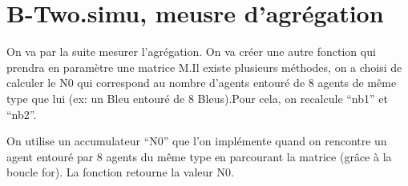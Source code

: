 \documentclass[
]{article}
\begin{document}
\hypertarget{b-two.simu-meusre-dagruxe9gation}{%
\section{B-Two.simu, meusre
d'agrégation}\label{b-two.simu-meusre-dagruxe9gation}}

On va par la suite mesurer l'agrégation. On va créer une autre fonction
qui prendra en paramètre une matrice M.Il existe plusieurs méthodes, on
a choisi de calculer le N0 qui correspond au nombre d'agents entouré de
8 agents de même type que lui (ex: un Bleu entouré de 8 Bleus).Pour
cela, on recalcule ``nb1'' et ``nb2''.

On utilise un accumulateur ``N0'' que l'on implémente quand on rencontre
un agent entouré par 8 agents du même type en parcourant la matrice
(grâce à la boucle for). La fonction retourne la valeur N0.
\end{document}

